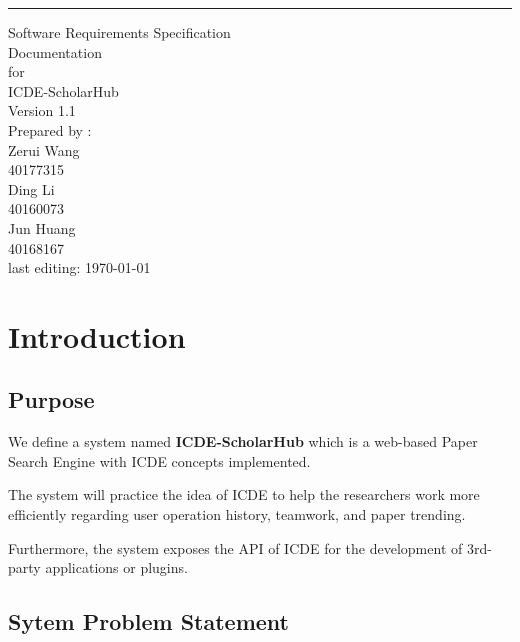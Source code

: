 \documentclass[]{scrreprt}
\def\myversion{1.1 }
\begin{document}
\begin{flushright}
	\rule{14cm}{2pt}
	\vskip1cm
	\begin{bfseries}
		\Huge{Software Requirements Specification\\Documentation}\\
		\vspace{1.5cm}
		for\\
		\vspace{1.5cm}
		ICDE-ScholarHub\\
		\LARGE{Version \myversion}\\
		\vspace{1.5cm}
		Prepared by : \\
		Zerui Wang\\
		{\small 40177315}\\
		Ding Li\\
		{\small 40160073}\\
		Jun Huang\\
		{\small 40168167}\\
		\vspace{1.5cm}
		{\footnotesize last editing: \today}
	\end{bfseries}
\end{flushright}

\thispagestyle{empty}

\tableofcontents

\thispagestyle{empty}

\chapter{Introduction}

\section{Purpose}

\noindent
We define a system named \textbf{ICDE-ScholarHub} which is a web-based Paper Search Engine with ICDE concepts implemented.

The system will practice the idea of ICDE to help the researchers work more efficiently regarding user operation history, teamwork, and paper trending.

Furthermore, the system exposes the API of ICDE for the development of 3rd-party applications or plugins.


\section{Sytem Problem Statement}
\end{document}
